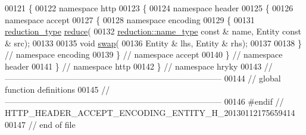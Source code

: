 \begin{DoxyCode}
00121 \{
00122 \textcolor{keyword}{namespace }http
00123 \{
00124 \textcolor{keyword}{namespace }header
00125 \{
00126 \textcolor{keyword}{namespace }accept
00127 \{
00128 \textcolor{keyword}{namespace }encoding
00129 \{
00131     \hyperlink{namespacehryky_a343a9a4c36a586be5c2693156200eadc}{reduction_type} \hyperlink{namespacehryky_1_1http_a08fc36a78a8e2908140fcd102829a566}{reduce}(
00132         \hyperlink{namespacehryky_1_1reduction_ac686c30a4c8d196bbd0f05629a6b921f}{reduction::name_type} \textcolor{keyword}{const} & name, Entity \textcolor{keyword}{const} & src);
00133 
00135     \textcolor{keywordtype}{void} \hyperlink{namespacehryky_1_1http_a38e62595ad532d18fbc65ceb61973aec}{swap}(
00136         Entity & lhs, Entity & rhs);
00137 
00138 \} \textcolor{comment}{// namespace encoding}
00139 \} \textcolor{comment}{// namespace accept}
00140 \} \textcolor{comment}{// namespace header}
00141 \} \textcolor{comment}{// namespace http}
00142 \} \textcolor{comment}{// namespace hryky}
00143 \textcolor{comment}{//
      ------------------------------------------------------------------------------}
00144 \textcolor{comment}{// global function definitions}
00145 \textcolor{comment}{//
      ------------------------------------------------------------------------------}
00146 \textcolor{preprocessor}{#endif // HTTP\_HEADER\_ACCEPT\_ENCODING\_ENTITY\_H\_20130112175659414}
00147 \textcolor{preprocessor}{}\textcolor{comment}{// end of file}
\end{DoxyCode}

